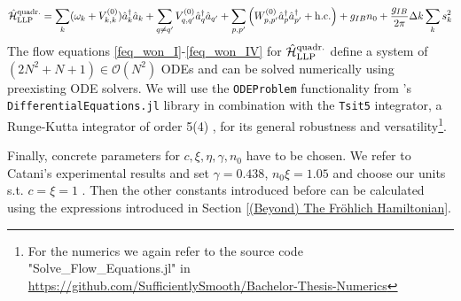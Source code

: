 \begin{equation}\label{Ham_LLP_qudratic}
\hat{\mathcal{H}}_{\mathrm{LLP}}^{\mathrm{quadr.}}=\sum\limits_k (\omega_k +V_{k,k}^{(0)})\hat a^\dagger_k\hat a_k+\sum\limits_{q\neq q^\prime}V_{q,q^\prime}^{(0)}\hat a^\dagger_q\hat a_{q^\prime}+\sum\limits_{p,p^\prime}\left(W_{p,p^\prime}^{(0)}\hat a^\dagger_p\hat a^\dagger_{p^\prime}+\mathrm{h.c.}\right)+g_{IB}n_0+\frac{g_{IB}}{2\pi}\Delta k\sum\limits_{k}s_k^2
\end{equation}
The flow equations \ref{feq_won_I}-\ref{feq_won_IV} for $\hat{\mathcal{H}}_{\mathrm{LLP}}^{\mathrm{quadr.}}$ define a system of $(2N^2+N+1)\in\mathcal O(N^2)$ ODEs and can be solved numerically using preexisting ODE solvers. We will use the \verb!ODEProblem! functionality from \julialogo's \verb!DifferentialEquations.jl! library in combination with the \verb!Tsit5! integrator, a Runge-Kutta integrator of order 5(4) \cite{TSITOURAS2011770}, for its general robustness and versatility\footnote{For the numerics we again refer to the source code "Solve\_Flow\_Equations.jl" in \url{https://github.com/SufficientlySmooth/Bachelor-Thesis-Numerics}}.\par
Finally, concrete parameters for $c,\xi,\eta,\gamma,n_0$ have to be chosen. We refer to Catani's experimental results and set $\gamma=0.438$, $n_0\xi=1.05$ and choose our units s.t. $c=\xi=1$ \cite{Catani,Grusdt_2017}.
Then the other constants introduced before can be calculated using the expressions introduced in Section \ref{(Beyond) The Fröhlich Hamiltonian}.
